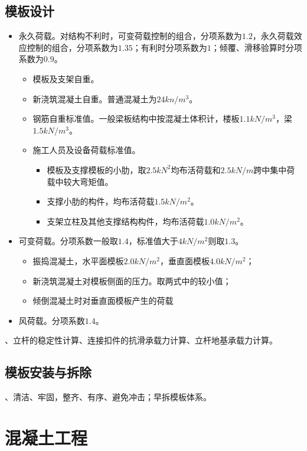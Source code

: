 \documentclass{book}
\begin{document}
\subsection{模板设计}
\begin{itemize}
    \item 永久荷载。对结构不利时，可变荷载控制的组合，分项系数为$1.2$，永久荷载效应控制的组合，分项系数为$1.35$；有利时分项系数为$1$；倾覆、滑移验算时分项系数为$0.9$。
          \begin{itemize}
              \item 模板及支架自重。
              \item 新浇筑混凝土自重。普通混凝土为$24kn/m^3$。
              \item 钢筋自重标准值。一般梁板结构中按混凝土体积计，楼板$1.1kN/m^3$，梁$1.5kN/m^3$。
              \item 施工人员及设备荷载标准值。
                    \begin{itemize}
                        \item 模板及支撑模板的小肋，取$2.5kN^2$均布活荷载和$2.5kN/m$跨中集中荷载中较大弯矩值。
                        \item 支撑小肋的构件，均布活荷载$1.5kN/m^2$。
                        \item 支架立柱及其他支撑结构构件，均布活荷载$1.0kN/m^2$。
                    \end{itemize}
          \end{itemize}
    \item 可变荷载。分项系数一般取$1.4$，标准值大于$4kN/m^2$则取$1.3$。
          \begin{itemize}
              \item 振捣混凝土，水平面模板$2.0kN/m^2$，垂直面模板$4.0kN/m^2$；
              \item 新浇筑混凝土对模板侧面的压力。取两式中的较小值；
              \item 倾倒混凝土时对垂直面模板产生的荷载
          \end{itemize}
    \item 风荷载。分项系数$1.4$。
\end{itemize}
、立杆的稳定性计算、连接扣件的抗滑承载力计算、立杆地基承载力计算。
\subsection{模板安装与拆除}
、清洁、牢固，整齐、有序、避免冲击；早拆模板体系。
\section{混凝土工程}
\end{document}
